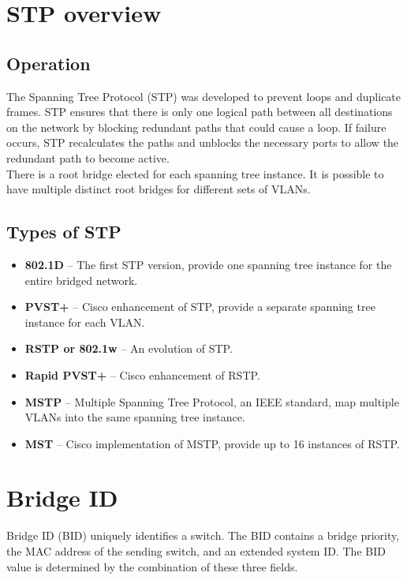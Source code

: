 \section{STP overview}

\subsection{Operation}

The Spanning Tree Protocol (STP) was developed to prevent loops and duplicate frames. STP ensures that there is only one logical path between all destinations on the network by blocking redundant paths that could cause a loop. If failure occurs, STP recalculates the paths and unblocks the necessary ports to allow the redundant path to become active.\\

There is a root bridge elected for each spanning tree instance. It is possible to have multiple distinct root bridges for different sets of VLANs.\\

\subsection{Types of STP}

\begin{itemize}
\item \textbf{802.1D} -- The first STP version, provide one spanning tree instance for the entire bridged network.
\item \textbf{PVST+} -- Cisco enhancement of STP, provide a separate spanning tree instance for each VLAN.
\item \textbf{RSTP or 802.1w} -- An evolution of STP.
\item \textbf{Rapid PVST+} -- Cisco enhancement of RSTP.
\item \textbf{MSTP} -- Multiple Spanning Tree Protocol, an IEEE standard, map multiple VLANs into the same spanning tree instance.
\item \textbf{MST} -- Cisco implementation of MSTP, provide up to 16 instances of RSTP.
\end{itemize}

\section{Bridge ID}

Bridge ID (BID) uniquely identifies a switch. The BID contains a bridge priority, the MAC address of the sending switch, and an extended system ID. The BID value is determined by the combination of these three fields.\\

